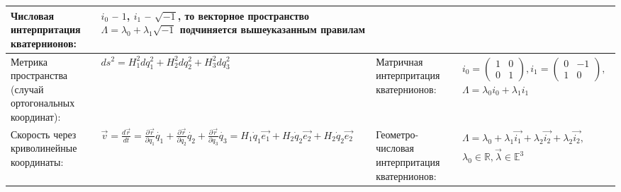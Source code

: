 \documentclass{article}
\begin{document}
\begin{tabular}{ |p{3.8cm}|p{5.7cm}|p{3.8cm}|p{5.7cm}|  }
Числовая интерпритация кватернионов:                                         &  %
$i_0$ -- $1$, $i_1$ -- $\sqrt{-1}$, то векторное пространство
$\Lambda = \lambda_0 + \lambda_1 \sqrt{-1}$ подчиняется вышеуказанным
правилам                                                                     \\ %
\hline
Метрика пространства (случай ортогональных координат):                       &  %
$ds^2 = H_1^2 d q_1^2 + H_2^2 d q_2^2 + H_3^2 d q_3^2$                       &  %
Матричная интерпритация кватернионов:                                        &  %
$\begin{aligned}
i_0 =
\left(\begin{array}{cc}
1 & 0 \\
0 & 1
\end{array}\right),
i_1 =
\left(\begin{array}{cc}
0 & -1 \\
1 & 0
\end{array}\right),      \\
\Lambda = \lambda_0 i_0 + \lambda_1 i_1
\end{aligned}$
                               \\ %
\hline
Скорость через криволинейные координаты:                                     &  %
$\vec{v} = \frac{d\vec{r}}{dt} =
 \frac{\partial \vec{r}}{\partial q_1} \dot{q_1} +
 \frac{\partial \vec{r}}{\partial q_2} \dot{q_2} +
 \frac{\partial \vec{r}}{\partial q_3} \dot{q_3} =
H_1 \dot q_1 \vec{e_1} + H_2 \dot q_2 \vec{e_2} + H_2 \dot q_2 \vec{e_2}$    &  %
Геометро-числовая интерпритация кватернионов:                                &  %
$\begin{aligned}
\Lambda = \lambda_0 + \lambda_1 \vec{i_1} +
 \lambda_2 \vec{i_2} + \lambda_2 \vec{i_2},         \\
\lambda_0 \in \mathbb{R}, \vec{\lambda} \in \mathbb{E}^3
\end{aligned}$


\\ %
\hline
\end{tabular}

\newpage
\end{document}
